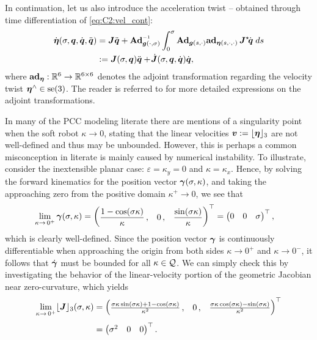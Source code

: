 In continuation, let us also introduce the acceleration twist \cite{Boyer2021,Mochiyama2003,Renda2018} -- obtained through time differentiation of \eqref{eq:C2:vel_cont}:
%
\begin{align}
\dot{\etaB}(\sigma,\q,\dq,\ddq) & = \JB \ddot{\q} + \Ad_{\gB(\cdot,\sigma)} \inv \int_0^\sigma \Ad_{\gB(s,\cdot)}
\ad_{\etaB(s,\cdot,\cdot)} \, \JB^\star\! \dq \;ds \notag \\
& :=  \JB(\sigma,\q)\ddot{\q} + \dmat{J}(\sigma,\q,\dot{\q}) \dot{\q},
\label{eq:C2:acceleration}
\end{align}
%
where $\textbf{ad}_{{\boldsymbol{\eta}}}: \mathbb{R}^{6} \to \mathbb{R}^{6\times 6}$ denotes the adjoint transformation regarding the velocity twist $\boldsymbol{{\boldsymbol{\eta}}}^\wedge \in \textup{\textrm{se}}(3)$. The reader is referred to  for more detailed expressions on the adjoint transformations.
%
\begin{rmk} In many of the PCC modeling literate there are mentions of a singularity point when the soft robot $\kappa \to 0$, stating that the linear velocities $\boldsymbol{v} := \lfloor{\boldsymbol{\eta}}\rfloor_3$ are not well-defined and thus may be unbounded. However, this is perhaps a common misconception in literate is mainly caused by numerical instability. To illustrate, consider the inextensible planar case: $\varepsilon = \kappa_y = 0$ and $\kappa = \kappa_x$. Hence, by solving the forward kinematics for the position vector ${\boldsymbol{\gamma}}(\sigma,\kappa)$, and taking the approaching zero from the positive domain $\kappa^{+} \to 0$, we see that
%
\begin{align}
\lim_{\kappa \to \,0^{+}}{\boldsymbol{\gamma}}(\sigma,\kappa) & = \begin{pmatrix} \dfrac{1-\cos(\sigma \kappa)}{\kappa}\,, & 0\,, & \dfrac{\sin(\sigma \kappa)}{\kappa} \end{pmatrix}^\top = \begin{pmatrix} 0 & 0 & \sigma \end{pmatrix}^\top,
\end{align}
%
which is clearly well-defined. Since the position vector ${\boldsymbol{\gamma}}$ is continuously differentiable when approaching the origin from both sides $\kappa \to 0^+$ and $\kappa \to 0^{-}$, it follows that $\dot{{\boldsymbol{\gamma}}}$ must be bounded for all $\kappa \in \mathcal{Q}$. We can simply check this by investigating the behavior of the linear-velocity portion of the geometric Jacobian near zero-curvature, which yields
%
\begin{align}
\lim_{\kappa \to \,0^+} \floor{\JB}_3(\sigma,\kappa) & = \begin{pmatrix} \tfrac{\sigma \kappa \sin(\sigma \kappa) + 1 - \cos(\sigma \kappa)}{\kappa^2}\,, & 0\,, & \tfrac{\sigma \kappa \cos(\sigma \kappa) - \sin(\sigma \kappa) }{\kappa^2} \end{pmatrix}^\top \notag \\[0.35em] & = \begin{pmatrix} \sigma^2 & 0 & 0 \end{pmatrix}^\top.

\end{align}
\end{rmk}
